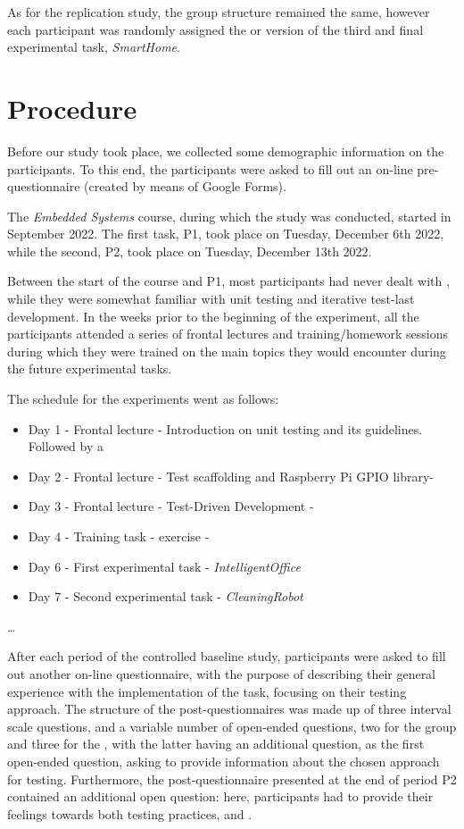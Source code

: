 As for the replication study, the group structure remained the same, however each participant was randomly assigned the \tdd or \notdd version of the third and final experimental task, \textit{SmartHome}.


\section{Procedure}
Before our study took place, we collected some demographic information on the participants. To this end, the participants were asked to fill out an on-line pre-questionnaire (created by means of Google Forms).

The \textit{Embedded Systems} course, during which the study was conducted, started in September 2022. The first task, P1, took place on Tuesday, December 6th 2022, while the second, P2, took place on Tuesday, December 13th 2022.

Between the start of the course and P1, most participants had never dealt with \tdd, while they were somewhat familiar with unit testing and iterative test-last development. 
In the weeks prior to the beginning of the experiment, all the participants attended a series of frontal lectures and training/homework sessions during which they were trained on the main topics they would encounter during the future experimental tasks.

The schedule for the experiments went as follows:
\begin{itemize}
    \item Day 1 - Frontal lecture - Introduction on unit testing and its guidelines. Followed by a
    \item Day 2 - Frontal lecture - Test scaffolding and Raspberry Pi GPIO library- 
    \item Day 3 - Frontal lecture - Test-Driven Development -
    \item Day 4 - Training task - \tdd exercise - 
    \item Day 6 - First experimental task - \textit{IntelligentOffice}
    \item Day 7 - Second experimental task - \textit{CleaningRobot}
\end{itemize}
\dots

After each period of the controlled baseline study, participants were asked to fill out another on-line questionnaire, with the purpose of describing their general experience with the implementation of the task, focusing on their testing approach. 
The structure of the post-questionnaires was made up of three interval scale questions, and a variable number of open-ended questions, two for the \tdd group and three for the \notdd, with the latter having an additional question, as the first open-ended question, asking to provide information about the chosen approach for testing. Furthermore, the post-questionnaire presented at the end of period P2 contained an additional open question: here, participants had to provide their feelings towards both testing practices, \tdd and \notdd. 

